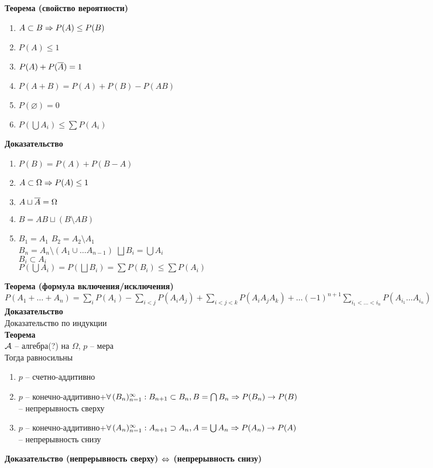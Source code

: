 \documentclass[12pt]{article}
\begin{document}
\textbf{Теорема (свойство вероятности)}
\begin{enumerate}
    \item $A \subset B \Rightarrow P(A) \leq P(B)$
    \item $P(A) \leq 1$
    \item $P(A) + P(\overline A) = 1$
    \item $P(A+B) = P(A) + P(B) - P(AB)$
    \item $P(\varnothing) = 0$
    \item $P(\bigcup A_i) \leq \sum P(A_i)$
\end{enumerate}
\textbf{Доказательство}
\begin{enumerate}
    \item $P(B) = P(A) + P(B - A)$
    \item $A \subset \Omega \Rightarrow P(A) \leq 1$
    \item $A \sqcup \overline A = \Omega$
    \item $B = AB \sqcup (B \setminus AB)$
    \item $B_1 = A_1$
    $B_2 = A_2 \setminus A_1$\\
    $B_n = A_n \setminus (A_1 \cup \ldots A_{n-1})$
    $\bigsqcup B_i = \bigcup A_i$\\
    $B_i \subset A_i$\\
    $P(\bigcup A_i) = P(\bigsqcup B_i) = \sum P(B_i) \leq \sum P(A_i)$
\end{enumerate}
\textbf{Теорема (формула включения/исключения)}\\
$P(A_1 + \ldots + A_n) = \sum_i P(A_i) - \sum_{i < j} P(A_iA_j) + \sum_{i<j<k} P(A_iA_jA_k) + \ldots (-1)^{n+1} \sum_{i_1 < \ldots < i_n} P(A_{i_1} \ldots A_{i_n})$
\textbf{Доказательство}\\
Доказательство по индукции\\
\textbf{Теорема}\\
$\mathcal{A}$ -- алгебра(?) на $\Omega$, $p$ -- мера\\
Тогда равносильны
\begin{enumerate}
    \item $p$ -- счетно-аддитивно
    \item $p$ -- конечно-аддитивно+$\forall\, (B_n)_{n=1}^\infty: B_{n+1} \subset B_n, B = \bigcap B_n \Rightarrow P(B_n) \rightarrow P(B)$ -- непрерывность сверху
    \item $p$ -- конечно-аддитивно+$\forall\, (A_n)_{n=1}^\infty: A_{n+1} \supset A_n, A = \bigcup A_n \Rightarrow P(A_n) \rightarrow P(A)$ -- непрерывность снизу
\end{enumerate}
\textbf{Доказательство (непрерывность сверху) $\Leftrightarrow$ (непрерывность снизу)}\\
\end{document}
